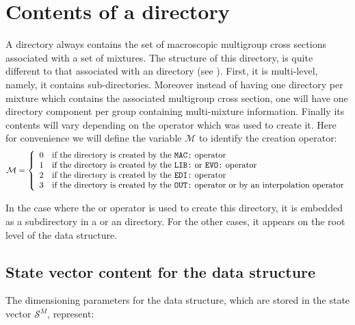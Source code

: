 \section{Contents of a  directory}\label{sect:macrolibdir}

A  directory always contains the set of macroscopic multigroup cross
sections associated with a set of mixtures. The structure of this directory,
is quite different to that associated with an  directory (see
). First, it is multi-level, namely, it contains sub-directories.
Moreover instead of having one directory per mixture which contains the
associated multigroup cross section, one will have one directory component per group containing
multi-mixture information. Finally its contents will vary depending on the operator
which was used to create it. Here for convenience we will define the variable $\mathcal{M}$ to
identify the creation operator:
\begin{displaymath}
\mathcal{M} = \left\{
\begin{array}{ll}
0 & \textrm{if the directory is created by the \moc{MAC:} operator}\\
1 & \textrm{if the directory is created by the \moc{LIB:} or \moc{EVO:} operator}\\
2 & \textrm{if the directory is created by the \moc{EDI:} operator}\\
3 & \textrm{if the directory is created by the \moc{OUT:} operator or by an interpolation operator}
\end{array} \right.
\end{displaymath}

In the case where the  or  operator is used to create this directory,
it is embedded as a subdirectory in a  or an  directory.
For the other cases, it appears on the root level of the  data structure.

\subsection{State vector content for the  data structure}\label{sect:macrolibstate}

The dimensioning parameters for the  data structure, which are stored in
the state vector $\mathcal{S}^{M}$, represent:

